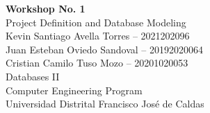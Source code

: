 \begin{titlepage}
    \thispagestyle{empty}
    \vspace*{\fill}
    \begin{center}
        {\LARGE \textbf{Workshop No. 1} \\[0.5cm]}
        {\Large Project Definition and Database Modeling \\[2cm]}
        {\large
        Kevin Santiago Avella Torres -- 2021202096 \\[0.3cm]
        Juan Esteban Oviedo Sandoval -- 20192020064 \\[0.3cm]
        Cristian Camilo Tuso Mozo -- 20201020053 \\[2cm]
        }
        {\large Databases II \\[0.3cm]
        Computer Engineering Program \\[0.3cm]
        Universidad Distrital Francisco José de Caldas \\}
    \end{center}
    \vspace*{\fill}
\end{titlepage}
